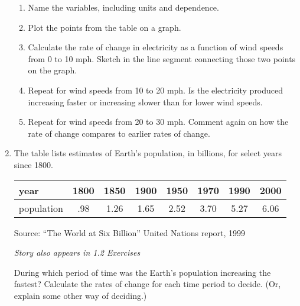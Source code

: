\begin{enumerate}
\begin{enumerate}
\item Name the variables, including units and dependence.
\item Plot the points from the table on a graph.
\item Calculate the rate of change in electricity as a function of wind speeds from 0 to 10 mph.  Sketch in the line segment connecting those two points on the graph.   
\item Repeat for wind speeds from 10 to 20 mph.  Is the electricity produced increasing faster or increasing slower than for lower wind speeds.
\item Repeat for wind speeds from 20 to 30 mph.  Comment again on how the rate of change compares to earlier rates of change.
\end{enumerate} 

\item The table lists estimates of Earth's population, in billions, for select years since 1800.   
\begin{center}
\begin{tabular} {|l |c |c |c |c |c |c |c |} \hline
year & 1800 & 1850 & 1900 & 1950 & 1970 & 1990 & 2000 \\ \hline
population & .98 & 1.26 & 1.65 & 2.52 & 3.70 & 5.27 & 6.06  \\ \hline
\end{tabular}
\end{center}
\hfill \begin{footnotesize} Source:  ``The World at Six Billion'' United Nations report, 1999\end{footnotesize}

\hfill \emph{Story also appears in 1.2 Exercises}

During which period of time was the Earth's population increasing the fastest?  Calculate the rates of change for each time period to decide.  (Or, explain some other way of deciding.)


\end{enumerate}

